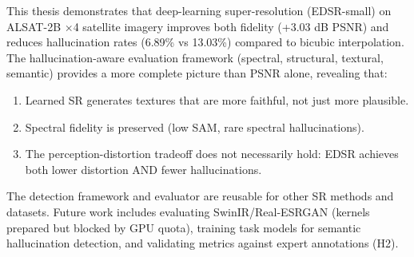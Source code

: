 This thesis demonstrates that deep-learning super-resolution (EDSR-small) on ALSAT-2B $\times$4 satellite imagery improves both fidelity (+3.03 dB PSNR) and reduces hallucination rates (6.89\% vs 13.03\%) compared to bicubic interpolation. The hallucination-aware evaluation framework (spectral, structural, textural, semantic) provides a more complete picture than PSNR alone, revealing that:

\begin{enumerate}
    \item Learned SR generates textures that are more faithful, not just more plausible.
    \item Spectral fidelity is preserved (low SAM, rare spectral hallucinations).
    \item The perception-distortion tradeoff does not necessarily hold: EDSR achieves both lower distortion AND fewer hallucinations.
\end{enumerate}

The detection framework and evaluator are reusable for other SR methods and datasets. Future work includes evaluating SwinIR/Real-ESRGAN (kernels prepared but blocked by GPU quota), training task models for semantic hallucination detection, and validating metrics against expert annotations (H2).
